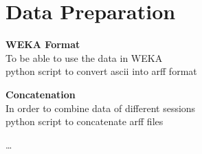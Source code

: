 
\section{Data Preparation}


\textbf{WEKA Format}\\
To be able to use the data in WEKA\\
\arr python script to convert ascii into arff format

\textbf{Concatenation}\\
In order to combine data of different sessions\\
\arr python script to concatenate arff files


\ldots
